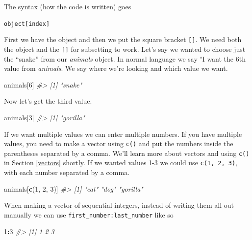 \documentclass[
  12pt,
]{book}
\newenvironment{Shaded}{\begin{snugshade}}{\end{snugshade}}
\newcommand{\CommentTok}[1]{\textcolor[rgb]{0.37,0.37,0.37}{\textit{#1}}}
\newcommand{\DecValTok}[1]{\textcolor[rgb]{0.06,0.06,0.06}{#1}}
\newcommand{\KeywordTok}[1]{\textcolor[rgb]{0.27,0.27,0.27}{\textbf{#1}}}
\newcommand{\NormalTok}[1]{#1}
\newcommand{\OperatorTok}[1]{\textcolor[rgb]{0.43,0.43,0.43}{\textbf{#1}}}
\begin{document}
The syntax (how the code is written) goes

\texttt{object{[}index{]}}

First we have the object and then we put the square bracket \texttt{{[}{]}}. We need both the object and the \texttt{{[}{]}} for subsetting to work. Let's say we wanted to choose just the ``snake'' from our \emph{animals} object. In normal language we say "I want the 6th value from \emph{animals}. We say where we're looking and which value we want.

\begin{Shaded}
\begin{Highlighting}[]
\NormalTok{animals[}\DecValTok{6}\NormalTok{]}
\CommentTok{\#> [1] "snake"}
\end{Highlighting}
\end{Shaded}

Now let's get the third value.

\begin{Shaded}
\begin{Highlighting}[]
\NormalTok{animals[}\DecValTok{3}\NormalTok{]}
\CommentTok{\#> [1] "gorilla"}
\end{Highlighting}
\end{Shaded}

If we want multiple values we can enter multiple numbers. If you have multiple values, you need to make a vector using \texttt{c()} and put the numbers inside the parentheses separated by a comma. We'll learn more about vectors and using \texttt{c()} in Section \ref{vectors} shortly. If we wanted values 1-3 we could use \texttt{c(1,\ 2,\ 3)}, with each number separated by a comma.

\begin{Shaded}
\begin{Highlighting}[]
\NormalTok{animals[}\KeywordTok{c}\NormalTok{(}\DecValTok{1}\NormalTok{, }\DecValTok{2}\NormalTok{, }\DecValTok{3}\NormalTok{)]}
\CommentTok{\#> [1] "cat"     "dog"     "gorilla"}
\end{Highlighting}
\end{Shaded}

When making a vector of sequential integers, instead of writing them all out manually we can use \texttt{first\_number:last\_number} like so

\begin{Shaded}
\begin{Highlighting}[]
\DecValTok{1}\OperatorTok{:}\DecValTok{3}
\CommentTok{\#> [1] 1 2 3}
\end{Highlighting}
\end{Shaded}
\end{document}
